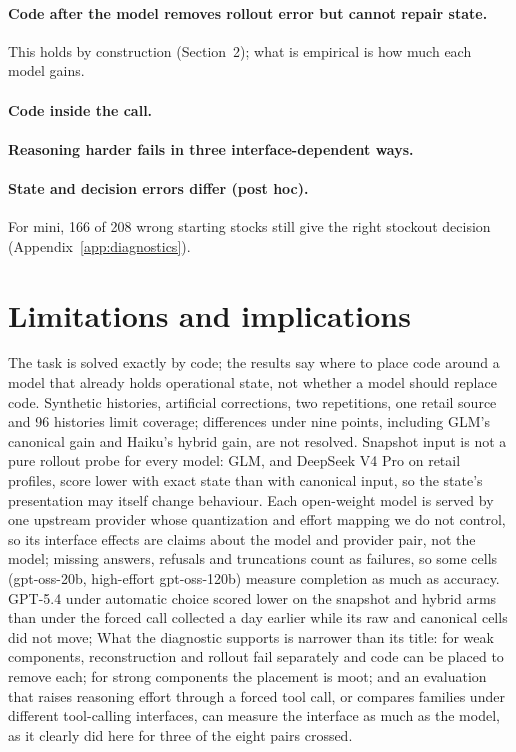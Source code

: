 \documentclass{article}
\begin{document}
\paragraph{Code after the model removes rollout error but cannot repair state.}
This holds by construction (Section~2); what is empirical is how much each model gains.


\paragraph{Code inside the call.}


\paragraph{Reasoning harder fails in three interface-dependent ways.}



\paragraph{State and decision errors differ (post hoc).} For mini, 166 of 208 wrong starting
stocks still give the right stockout decision (Appendix~\ref{app:diagnostics}).

\section{Limitations and implications}
The task is solved exactly by code; the results say where to place code around a model that
already holds operational state, not whether a model should replace code. Synthetic histories, artificial corrections, two repetitions, one retail source
and 96 histories limit coverage; differences under nine points, including GLM's canonical gain and
Haiku's hybrid gain, are not resolved. Snapshot input is not a pure rollout probe for every
model: GLM, and DeepSeek V4 Pro on retail profiles, score lower with exact state than with
canonical input, so the state's presentation may itself change behaviour.
Each open-weight model is served by one upstream provider whose quantization and effort
mapping we do not control, so its interface effects are claims about the model and provider
pair, not the model; missing answers, refusals and truncations count as failures,
so some cells (gpt-oss-20b, high-effort gpt-oss-120b) measure completion as much as
accuracy. GPT-5.4 under automatic choice scored lower on the snapshot and hybrid arms than
under the forced call collected a day earlier while its raw and canonical cells did not move;
\GptReplicationSentence
What the diagnostic supports is narrower than its title: for weak components, reconstruction
and rollout fail separately and code can be placed to remove each; for strong components the
placement is moot; and an evaluation that raises reasoning effort through a forced tool call,
or compares families under different tool-calling interfaces, can measure the interface as
much as the model, as it clearly did here for three of the eight pairs crossed.
\end{document}
